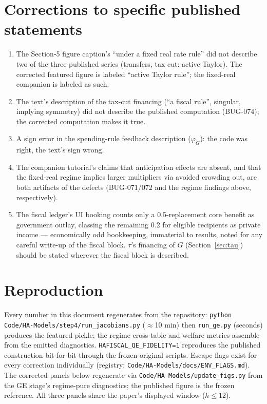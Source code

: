 \documentclass[11pt]{article}
\begin{document}
\section{Corrections to specific published statements}
\label{sec:errata}

\begin{enumerate}\itemsep2pt
\item The Section-5 figure caption's ``under a fixed real rate rule''
  did not describe two of the three published series (transfers, tax
  cut: active Taylor). The corrected featured figure is labeled
  ``active Taylor rule''; the fixed-real companion is labeled as such.
\item The text's description of the tax-cut financing (``a fiscal
  rule'', singular, implying symmetry) did not describe the published
  computation (BUG-074); the corrected computation makes it true.
\item A sign error in the spending-rule feedback description
  ($\varphi_G$): the code was right, the text's sign wrong.
\item The companion tutorial's claims that anticipation effects are
  absent, and that the fixed-real regime implies larger multipliers via
  avoided crowding out, are both artifacts of the defects (BUG-071/072
  and the regime findings above, respectively).
\item The fiscal ledger's UI booking counts only a 0.5-replacement core
  benefit as government outlay, classing the remaining 0.2 for eligible
  recipients as private income --- economically odd bookkeeping,
  immaterial to results, noted for any careful write-up of the fiscal
  block. $\tau$'s financing of $G$ (Section~\ref{sec:tau}) should be
  stated wherever the fiscal block is described.
\end{enumerate}

\section{Reproduction}
\label{sec:repro}

Every number in this document regenerates from the repository:
\texttt{python Code/HA-Models/step4/run\_jacobians.py} ($\approx$10
min) then \texttt{run\_ge.py} (seconds) produces the featured pickle;
the regime cross-table and welfare metrics assemble from the emitted
diagnostics. \texttt{HAFISCAL\_QE\_FIDELITY=1} reproduces the published
construction bit-for-bit through the frozen original scripts. Escape
flags exist for every correction individually (registry:
\texttt{Code/HA-Models/docs/ENV\_FLAGS.md}). The corrected panels below
regenerate via \texttt{Code/HA-Models/update\_figs.py} from the GE
stage's regime-pure diagnostics; the published figure is the frozen
reference. All three panels share the paper's displayed window
($h\le 12$).
\end{document}
